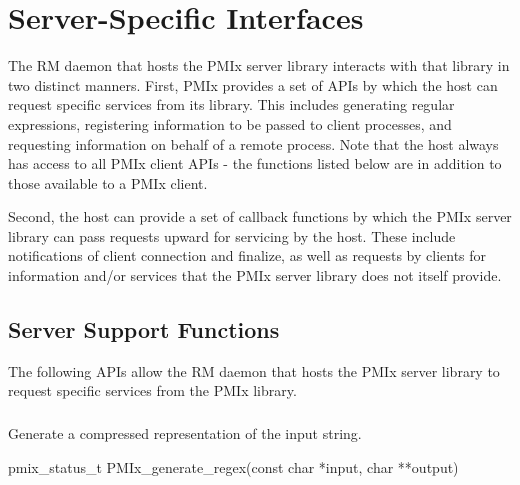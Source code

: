 \chapter{Server-Specific Interfaces}
\label{chap:api_server}

The \ac{RM} daemon that hosts the \ac{PMIx} server library interacts with that library in two distinct manners. First, \ac{PMIx} provides a set of \acp{API} by which the host can request specific services from its library. This includes generating regular expressions, registering information to be passed to client processes, and requesting information on behalf of a remote process. Note that the host always has access to all \ac{PMIx} client \acp{API} - the functions listed below are in addition to those available to a \ac{PMIx} client.

Second, the host can provide a set of callback functions by which the \ac{PMIx} server library can pass requests upward for servicing by the host. These include notifications of client connection and finalize, as well as requests by clients for information and/or services that the \ac{PMIx} server library does not itself provide.

\section{Server Support Functions}

The following \acp{API} allow the \ac{RM} daemon that hosts the \ac{PMIx} server library to request specific services from the \ac{PMIx} library.

\subsection{}

\summary

Generate a compressed representation of the input string.

\format

\cspecificstart
\begin{codepar}
pmix_status_t
PMIx_generate_regex(const char *input, char **output)
\end{codepar}
\cspecificend

\begin{arglist}
\end{arglist}

